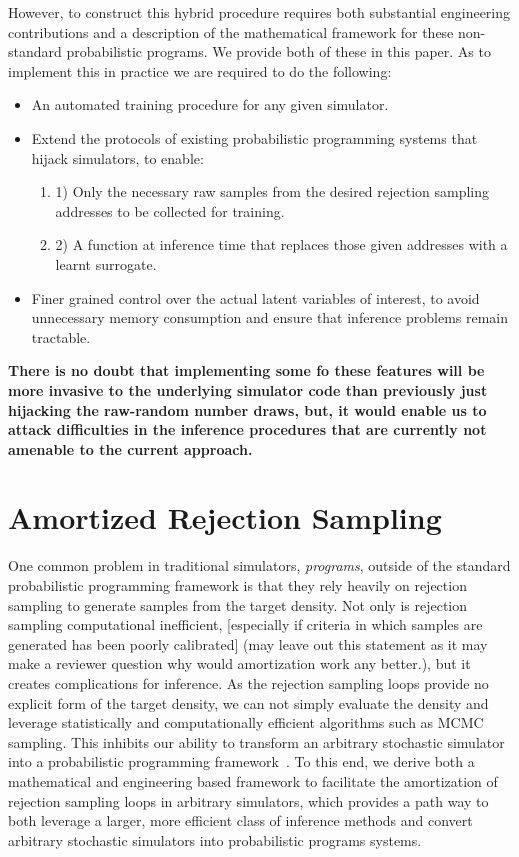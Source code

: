 \documentclass{article}
\begin{document}
However, to construct this hybrid procedure requires both substantial engineering contributions 
and a description of the mathematical framework for these non-standard probabilistic programs. 
We provide both of these in this paper. As to implement this in practice we are required to do the following:
 \begin{itemize}
    \item An automated training procedure for any given simulator.
    \item Extend the protocols of existing probabilistic programming systems that hijack simulators, to enable:
    \begin{enumerate} \item 1) Only the necessary raw samples from the desired rejection sampling addresses to be collected for training.
                       \item 2) A function at inference time that replaces those given addresses with a learnt surrogate.
    \end{enumerate}
    \item Finer grained control over the actual latent variables of interest, to avoid unnecessary memory consumption and ensure that inference problems remain tractable.
  \end{itemize}

\textbf{There is no doubt that implementing some fo these features will be more invasive to the underlying simulator code than previously
just hijacking the raw-random number draws, but, it would enable us to attack difficulties in the inference procedures that are
currently not amenable to the current approach.}

\section{Amortized Rejection Sampling}

One common problem in traditional simulators, \emph{programs}, outside of the standard probabilistic
programming framework is that they rely heavily on rejection sampling 
to generate samples from the target density. Not only is rejection sampling 
computational inefficient, [especially if criteria in which samples are generated
has been poorly calibrated] (may leave out this statement as it may make a reviewer
question why would amortization work any better.), but it creates complications for inference.
As the rejection sampling loops provide no explicit form of the target density,
we can not simply evaluate the density and leverage statistically and computationally
efficient algorithms such as MCMC sampling. This inhibits our ability to transform an arbitrary
stochastic simulator into a probabilistic programming framework~\cite{baydin2018efficient}. 
To this end, we derive both a mathematical and engineering based framework to facilitate 
the amortization of rejection sampling loops in arbitrary simulators, which provides a path
way to both leverage a larger, more efficient class of inference methods and convert arbitrary
stochastic simulators into probabilistic programs systems.
\end{document}
